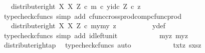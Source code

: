 \begin{isabellebody}
\ {\isachardoublequoteopen}{\isachardot}{\kern0pt}{\isachardot}{\kern0pt}{\isachardot}{\kern0pt}\ {\isacharequal}{\kern0pt}\ distribute{\isacharunderscore}{\kern0pt}right\ X\ X\ Z\ {\isasymcirc}\isactrlsub c\ {\isasymlangle}m\ {\isasymcirc}\isactrlsub c\ y{\isacharprime}{\kern0pt}{\isacharcomma}{\kern0pt}id\isactrlsub c\ Z\ {\isasymcirc}\isactrlsub c\ z{\isasymrangle}{\isachardoublequoteclose}\isanewline
\ \ \ \ \ \ \ \ \isamarkupfalse%
\ {\isacharparenleft}{\kern0pt}typecheck{\isacharunderscore}{\kern0pt}cfuncs{\isacharcomma}{\kern0pt}\ simp\ add{\isacharcolon}{\kern0pt}\ cfunc{\isacharunderscore}{\kern0pt}cross{\isacharunderscore}{\kern0pt}prod{\isacharunderscore}{\kern0pt}comp{\isacharunderscore}{\kern0pt}cfunc{\isacharunderscore}{\kern0pt}prod{\isacharparenright}{\kern0pt}\isanewline
\ \ \ \ \ \ \isamarkupfalse%
\ \isamarkupfalse%
\ {\isachardoublequoteopen}{\isachardot}{\kern0pt}{\isachardot}{\kern0pt}{\isachardot}{\kern0pt}\ {\isacharequal}{\kern0pt}\ distribute{\isacharunderscore}{\kern0pt}right\ X\ X\ Z\ {\isasymcirc}\isactrlsub c\ {\isasymlangle}{\isasymlangle}my{}{\isacharcomma}{\kern0pt}my{}{\isasymrangle}{\isacharcomma}{\kern0pt}\ z{\isasymrangle}{\isachardoublequoteclose}\isanewline
\ \ \ \ \ \ \ \ \isamarkupfalse%
\ y{\isacharprime}{\kern0pt}{\isacharunderscore}{\kern0pt}def\ \isamarkupfalse%
\ {\isacharparenleft}{\kern0pt}typecheck{\isacharunderscore}{\kern0pt}cfuncs{\isacharcomma}{\kern0pt}\ simp\ add{\isacharcolon}{\kern0pt}\ id{\isacharunderscore}{\kern0pt}left{\isacharunderscore}{\kern0pt}unit{}{\isacharparenright}{\kern0pt}\isanewline
\ \ \ \ \ \ \isamarkupfalse%
\ \isamarkupfalse%
\ {\isachardoublequoteopen}{\isachardot}{\kern0pt}{\isachardot}{\kern0pt}{\isachardot}{\kern0pt}\ {\isacharequal}{\kern0pt}\ {\isasymlangle}{\isasymlangle}my{}{\isacharcomma}{\kern0pt}z{\isasymrangle}{\isacharcomma}{\kern0pt}\ {\isasymlangle}my{}{\isacharcomma}{\kern0pt}z{\isasymrangle}{\isasymrangle}{\isachardoublequoteclose}\isanewline
\ \ \ \ \ \ \ \ \isamarkupfalse%
\ distribute{\isacharunderscore}{\kern0pt}right{\isacharunderscore}{\kern0pt}ap\ \isamarkupfalse%
\ {\isacharparenleft}{\kern0pt}typecheck{\isacharunderscore}{\kern0pt}cfuncs{\isacharcomma}{\kern0pt}\ auto{\isacharparenright}{\kern0pt}\isanewline
\ \ \ \ \ \ \isamarkupfalse%
\ \isamarkupfalse%
\ {\isachardoublequoteopen}{\isachardot}{\kern0pt}{\isachardot}{\kern0pt}{\isachardot}{\kern0pt}\ {\isacharequal}{\kern0pt}\ {\isasymlangle}{\isasymlangle}tx{\isacharcomma}{\kern0pt}tz{\isasymrangle}{\isacharcomma}{\kern0pt}\ {\isasymlangle}sx{\isacharcomma}{\kern0pt}sz{\isasymrangle}{\isasymrangle}{\isachardoublequoteclose}\isanewline

\end{isabellebody}
